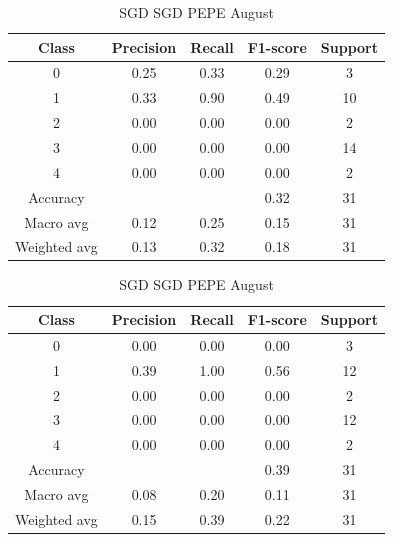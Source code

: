 \begin{enumerate}
\begin{enumerate}
                \begin{table}[H]
                \centering
                \scriptsize
                \begin{minipage}{0.48\textwidth}
                \centering
                \begin{tabular}{c|cccc}
                \hline
                Class & Precision & Recall & F1-score & Support \\
                \hline
                0 & 0.25 & 0.33 & 0.29 & 3 \\
                1 & 0.33 & 0.90 & 0.49 & 10 \\
                2 & 0.00 & 0.00 & 0.00 & 2 \\
                3 & 0.00 & 0.00 & 0.00 & 14 \\
                4 & 0.00 & 0.00 & 0.00 & 2 \\
                \hline
                Accuracy &       &      & 0.32 & 31 \\
                Macro avg & 0.12 & 0.25 & 0.15 & 31 \\
                Weighted avg & 0.13 & 0.32 & 0.18 & 31 \\
                \hline
                \end{tabular}
                \caption{SGD SGD DOGE August}
                \label{tab:classifier_2_report_sgd_sgd_doge_filtered_aug}
                \end{minipage}%
                \hfill
                \begin{minipage}{0.48\textwidth}
                \centering
                \begin{tabular}{c|cccc}
                \hline
                Class & Precision & Recall & F1-score & Support \\
                \hline
                0 & 0.00 & 0.00 & 0.00 & 3 \\
                1 & 0.39 & 1.00 & 0.56 & 12 \\
                2 & 0.00 & 0.00 & 0.00 & 2 \\
                3 & 0.00 & 0.00 & 0.00 & 12 \\
                4 & 0.00 & 0.00 & 0.00 & 2 \\
                \hline
                Accuracy &       &      & 0.39 & 31 \\
                Macro avg & 0.08 & 0.20 & 0.11 & 31 \\
                Weighted avg & 0.15 & 0.39 & 0.22 & 31 \\
                \hline
                \end{tabular}
                \caption{SGD SGD PEPE August}
                \label{tab:classifier_2_report_sgd_sgd_pepe_filtered_aug}
                \end{minipage}
                

\end{table}
\end{enumerate}
\end{enumerate}
